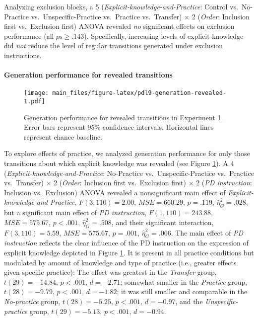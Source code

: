 \documentclass[man]{apa6}
\theoremstyle{definition}
\theoremstyle{definition}
\theoremstyle{definition}
\theoremstyle{remark}
\begin{document}
Analyzing exclusion blocks, a 5 (\emph{Explicit-knowledge-and-Practice}:
Control vs.~No-Practice vs.~Unspecific-Practice vs.~Practice
vs.~Transfer) \(\times\) 2 (\emph{Order}: Inclusion first vs.~Exclusion
first) ANOVA revealed \emph{no} significant effects on exclusion
performance (all \(p\mathrm{s} \geq .143\)). Specifically, increasing
levels of explicit knowledge did \emph{not} reduce the level of regular
transitions generated under exclusion instructions.

\paragraph{Generation performance for revealed
transitions}\label{generation-performance-for-revealed-transitions}

\begin{figure}
\centering
\texttt{[image: main\_files/figure-latex/pdl9-generation-revealed-1.pdf]}
\caption{\label{fig:pdl9-generation-revealed}Generation performance for
revealed transitions in Experiment 1. Error bars represent 95\%
confidence intervals. Horizontal lines represent chance baseline.}
\end{figure}

To explore effects of practice, we analyzed generation performance for
only those transitions about which explicit knowledge was revealed (see
Figure \ref{fig:pdl9-generation-revealed}). A 4
(\emph{Explicit-knowledge-and-Practice}: No-Practice
vs.~Unspecific-Practice vs.~Practice vs.~Transfer) \(\times\) 2
(\emph{Order}: Inclusion first vs.~Exclusion first) \(\times\) 2
(\emph{PD instruction}: Inclusion vs.~Exclusion) ANOVA revealed a
nonsignificant main effect of \emph{Explicit-knowledge-and-Practice},
\(F(3, 110) = 2.00\), \(\mathit{MSE} = 660.29\), \(p = .119\),
\(\hat{\eta}^2_G = .028\), but a significant main effect of \emph{PD
instruction}, \(F(1, 110) = 243.88\), \(\mathit{MSE} = 575.67\),
\(p < .001\), \(\hat{\eta}^2_G = .508\), and their significant
interaction, \(F(3, 110) = 5.59\), \(\mathit{MSE} = 575.67\),
\(p = .001\), \(\hat{\eta}^2_G = .066\). The main effect of \emph{PD
instruction} reflects the clear influence of the PD instruction on the
expression of explicit knowledge depicted in Figure
\ref{fig:pdl9-generation-revealed}. It is present in all practice
conditions but modulated by amount of knowledge and type of practice
(i.e., greater effects given specific practice): The effect was greatest
in the \emph{Transfer} group, \(t(29) = -14.84\), \(p < .001\),
\(d = -2.71\); somewhat smaller in the \emph{Practice} group,
\(t(28) = -9.79\), \(p < .001\), \(d = -1.82\); it was still smaller and
comparable in the \emph{No-practice} group, \(t(28) = -5.25\),
\(p < .001\), \(d = -0.97\), and the \emph{Unspecific-practice} group,
\(t(29) = -5.13\), \(p < .001\), \(d = -0.94\).
\end{document}
